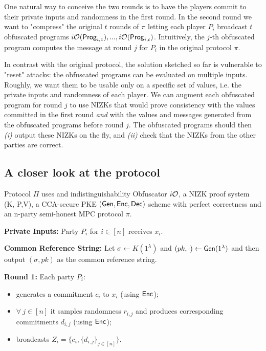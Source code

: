 One natural way to conceive the two rounds is to have the players commit to their private inputs and randomness in the first round.
In the second round we want to "compress" the original $t$ rounds of $\pi$ letting each player $P_i$ broadcast $t$ obfuscated programs
$i\mathcal{O}(\mathsf{Prog}_{i,1}),...,i\mathcal{O}(\mathsf{Prog}_{i,t})$. Intuitively, the $j$-th obfuscated program computes the message at round $j$ for $P_i$ in the original protocol $\pi$.

In contrast with the original protocol, the solution sketched so far is vulnerable to "reset" attacks: the obfuscated programs can be evaluated on multiple inputs. Roughly, we want them to be usable only on a specific set of values, i.e. the private inputs and randomness of each player.
We can augment each obfuscated program for round $j$ to use NIZKs that would prove consistency with the values committed in the first round \emph{and} with the values and messages generated from the obfuscated programs before round $j$. The obfuscated programs should then \emph{(i)} output these NIZKs on the fly, and \emph{(ii)} check that the NIZKs from the other parties are correct.

\subsection{A closer look at the protocol}
Protocol $\Pi$ uses and indistinguishability Obfuscator $i\mathcal{O}$, a NIZK proof system (K, P,V), a CCA-secure PKE
$(\mathsf{Gen}, \mathsf{Enc}, \mathsf{Dec})$
scheme with perfect correctness and an n-party semi-honest MPC protocol $\pi$.

\noindent
\textbf{Private Inputs:} Party $P_i$ for $i \in [n]$ receives $x_i$.

\noindent
\textbf{Common Reference String:} Let $\sigma \gets K(1^{\lambda})$ and $(pk, \cdot) \gets \mathsf{Gen}(1^{\lambda})$ and then output $(\sigma, pk)$ as the common reference string.

\noindent
\textbf{Round 1:} Each party $P_i$:
\begin{itemize}
	\item generates a commitment $c_i$ to $x_i$ (using $\mathsf{Enc}$);
	\item $\forall\ j \in [n]$ it samples randomness $r_{i,j}$ and produces corresponding commitments $d_{i,j}$ (using $\mathsf{Enc}$);
	\item broadcasts $Z_i = \{c_i, \{ d_{i,j} \}_{j \in [n]}  \}$.
\end{itemize}

